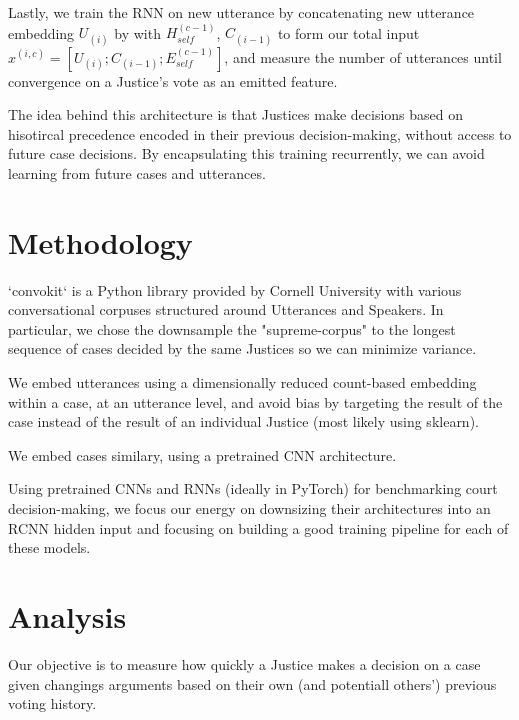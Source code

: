 \documentclass[a4paper]{article}
\begin{document}

Lastly, we train the RNN on new utterance by concatenating new utterance embedding $U_{(i)}$ by  with $H_{self}^{(c-1)}$, $C_{(i-1)}$ to form our total input $x^{(i, c)} = \left[ U_{(i)}; C_{(i-1)}; E_{self}^{(c-1)} \right]$, and measure the number of utterances until convergence on a Justice's vote as an emitted feature.

The idea behind this architecture is that Justices make decisions based on hisotircal precedence encoded in their previous decision-making, without access to future case decisions. By encapsulating this training recurrently, we can avoid learning from future cases and utterances.

\section{Methodology}
`convokit` is a Python library provided by Cornell University with various conversational corpuses structured around Utterances and Speakers. In particular, we chose the downsample the "supreme-corpus" to the longest sequence of cases decided by the same Justices so we can minimize variance.

We embed utterances using a dimensionally reduced count-based embedding within a case, at an utterance level, and avoid bias by targeting the result of the case instead of the result of an individual Justice (most likely using sklearn).

We embed cases similary, using a pretrained CNN architecture.

Using pretrained CNNs and RNNs (ideally in PyTorch) for benchmarking court decision-making, we focus our energy on downsizing their architectures into an RCNN hidden input and focusing on building a good training pipeline for each of these models.

\section{Analysis}
Our objective is to measure how quickly a Justice makes a decision on a case given changings arguments based on their own (and potentiall others') previous voting history.
\end{document}

